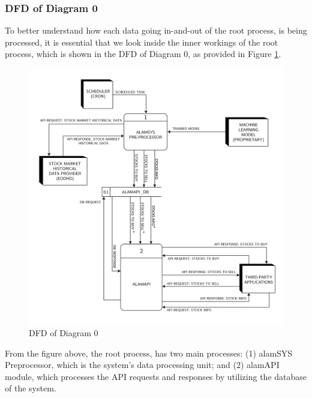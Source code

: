 \subsubsection{DFD of Diagram 0}
\label{subsubsec:dfd0}
To better understand how each data going in-and-out 
of the root process, is being processed, it is essential that we look inside 
the inner workings of the root process, which is shown in the DFD of Diagram 0, 
as provided in Figure \ref{fig:dfd0}.
\begin{figure}[ht]
    \centering
    \includegraphics[width=1\textwidth]{./assets//Data Flow Diagram-02.png}
    \caption{DFD of Diagram 0}
    \label{fig:dfd0}
\end{figure}
\FloatBarrier

From the figure above, the root process, has two main processes: 
(1) alamSYS Preprocessor, which is the system’s data processing unit; and 
(2) alamAPI module, which processes the API 
requests and responses by utilizing the database of the system.

